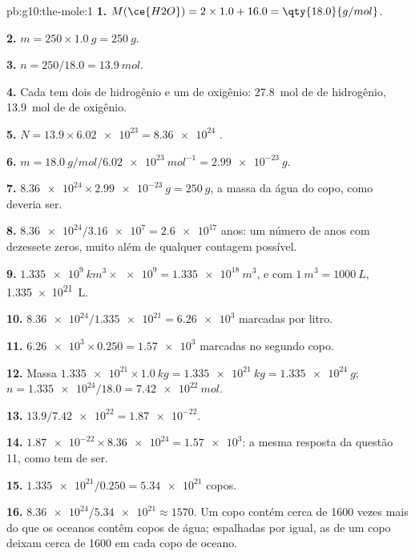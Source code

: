 \begin{solution}{pb:g10:the-mole:1}
\textbf{1.} $M(\ce{H2O}) = 2 \times 1.0 + 16.0 = \qty{18.0}{g/mol}$.

\textbf{2.} $m = 250 \times \qty{1.0}{g} = \qty{250}{g}$.

\textbf{3.} $n = 250 / 18.0 = \qty{13.9}{mol}$.

\textbf{4.} Cada  tem dois  de hidrogênio e um  de
oxigênio: \qty{27.8}{mol} de  de hidrogênio, \qty{13.9}{mol} de
 de oxigênio.

\textbf{5.} $N = 13.9 \times \num{6.02e23} = \num{8.36e24}$ .

\textbf{6.} $m = \qty{18.0}{g/mol} / \qty{6.02e23}{mol^{-1}} =
\qty{2.99e-23}{g}$.

\textbf{7.} $\num{8.36e24} \times \qty{2.99e-23}{g} = \qty{250}{g}$, a
massa da água do copo, como deveria ser.

\textbf{8.} $\num{8.36e24} / \num{3.16e7} = \num{2.6e17}$ anos: um
número de anos com dezessete zeros, muito além de qualquer contagem
possível.

\textbf{9.} $\qty{1.335e9}{km^3} \times \num{e9} = \qty{1.335e18}{m^3}$,
e com $\qty{1}{m^3} = \qty{1000}{L}$, \qty{1.335e21}{L}.

\textbf{10.} $\num{8.36e24} / \num{1.335e21} = \num{6.26e3}$ 
marcadas por litro.

\textbf{11.} $\num{6.26e3} \times 0.250 = \num{1.57e3}$ 
marcadas no segundo copo.

\textbf{12.} Massa $\num{1.335e21} \times \qty{1.0}{kg} =
\qty{1.335e21}{kg} = \qty{1.335e24}{g}$; $n = \num{1.335e24} / 18.0 =
\qty{7.42e22}{mol}$.

\textbf{13.} $13.9 / \num{7.42e22} = \num{1.87e-22}$.

\textbf{14.} $\num{1.87e-22} \times \num{8.36e24} = \num{1.57e3}$: a
mesma resposta da questão 11, como tem de ser.

\textbf{15.} $\num{1.335e21} / 0.250 = \num{5.34e21}$ copos.

\textbf{16.} $\num{8.36e24} / \num{5.34e21} \approx 1570$. Um copo
contém cerca de 1600 vezes mais  do que os oceanos contêm copos
de água; espalhadas por igual, as  de um copo deixam cerca de
1600 em cada copo de oceano.


\end{solution}
